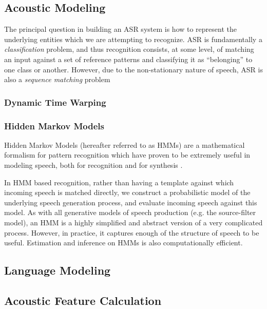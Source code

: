 \documentclass{article}
\begin{document}
\subsection{Acoustic Modeling}
\label{sec:hmm}

The principal question in building an ASR system is how to represent
the underlying entities which we are attempting to recognize.  ASR is
fundamentally a {\em classification} problem, and thus recognition
consists, at some level, of matching an input against a set of
reference patterns and classifying it as ``belonging'' to one class or
another.  However, due to the non-stationary nature of speech, ASR is
also a {\em sequence matching} problem

\subsubsection{Dynamic Time Warping}
\label{sec:dtw}

\subsubsection{Hidden Markov Models}
\label{sec:hmm}

Hidden Markov Models (hereafter referred to as HMMs) are a
mathematical formalism for pattern recognition which have proven to be
extremely useful in modeling speech, both for recognition
\cite{rabiner1989} and for synthesis \cite{masuko1996}.

In HMM based recognition, rather than having a template against which
incoming speech is matched directly, we construct a probabilistic
model of the underlying speech generation process, and evaluate
incoming speech against this model.  As with all generative models of
speech production (e.g. the source-filter model), an HMM is a highly
simplified and abstract version of a very complicated process.
However, in practice, it captures enough of the structure of speech to
be useful.  Estimation and inference on HMMs is also computationally
efficient.

\subsection{Language Modeling}
\label{sec:ngrams}

\subsection{Acoustic Feature Calculation}
\label{sec:fe}
\end{document}
